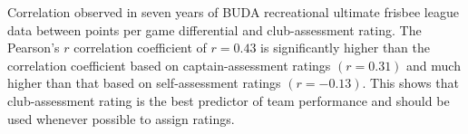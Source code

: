 Correlation observed in seven years of BUDA recreational ultimate frisbee league data between points per game differential and club-assessment rating. The Pearson's $r$ correlation coefficient of $r = 0.43$ is significantly higher than the correlation coefficient based on captain-assessment ratings $(r = 0.31)$ and much higher than that based on self-assessment ratings $(r = -0.13)$. This shows that club-assessment rating is the best predictor of team performance and should be used whenever possible to assign ratings. \label{fig:correlation_club}